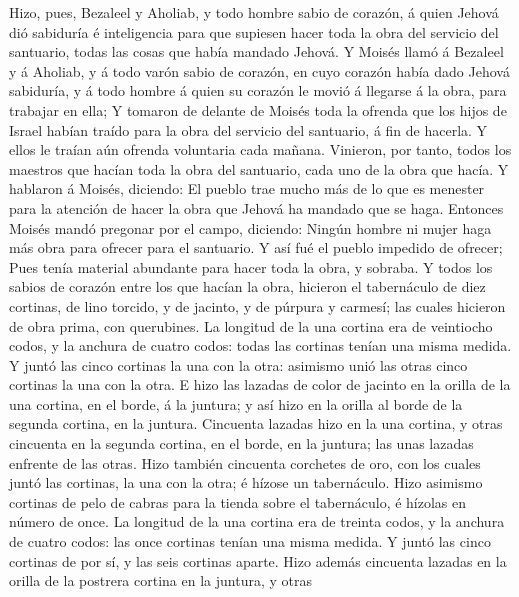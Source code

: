  Hizo, pues, Bezaleel y Aholiab, y todo hombre sabio de
corazón, á quien Jehová dió sabiduría é inteligencia para que supiesen
hacer toda la obra del servicio del santuario, todas las cosas que había
mandado Jehová.  Y Moisés llamó á Bezaleel y á Aholiab, y á
todo varón sabio de corazón, en cuyo corazón había dado Jehová
sabiduría, y á todo hombre á quien su corazón le movió á llegarse á la
obra, para trabajar en ella;  Y tomaron de delante de Moisés
toda la ofrenda que los hijos de Israel habían traído para la obra del
servicio del santuario, á fin de hacerla. Y ellos le traían aún ofrenda
voluntaria cada mañana.  Vinieron, por tanto, todos los
maestros que hacían toda la obra del santuario, cada uno de la obra que
hacía.  Y hablaron á Moisés, diciendo: El pueblo trae mucho
más de lo que es menester para la atención de hacer la obra que Jehová
ha mandado que se haga.  Entonces Moisés mandó pregonar por
el campo, diciendo: Ningún hombre ni mujer haga más obra para ofrecer
para el santuario. Y así fué el pueblo impedido de ofrecer; 
Pues tenía material abundante para hacer toda la obra, y sobraba.
 Y todos los sabios de corazón entre los que hacían la obra,
hicieron el tabernáculo de diez cortinas, de lino torcido, y de jacinto,
y de púrpura y carmesí; las cuales hicieron de obra prima, con
querubines.  La longitud de la una cortina era de veintiocho
codos, y la anchura de cuatro codos: todas las cortinas tenían una misma
medida.  Y juntó las cinco cortinas la una con la otra:
asimismo unió las otras cinco cortinas la una con la otra. 
E hizo las lazadas de color de jacinto en la orilla de la una cortina,
en el borde, á la juntura; y así hizo en la orilla al borde de la
segunda cortina, en la juntura.  Cincuenta lazadas hizo en
la una cortina, y otras cincuenta en la segunda cortina, en el borde, en
la juntura; las unas lazadas enfrente de las otras.  Hizo
también cincuenta corchetes de oro, con los cuales juntó las cortinas,
la una con la otra; é hízose un tabernáculo.  Hizo asimismo
cortinas de pelo de cabras para la tienda sobre el tabernáculo, é
hízolas en número de once.  La longitud de la una cortina
era de treinta codos, y la anchura de cuatro codos: las once cortinas
tenían una misma medida.  Y juntó las cinco cortinas de por
sí, y las seis cortinas aparte.  Hizo además cincuenta
lazadas en la orilla de la postrera cortina en la juntura, y otras
